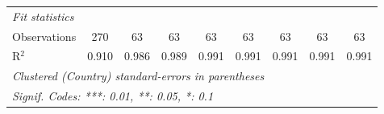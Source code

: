 \begin{table}[htbp]
\begin{tabular}{lcccccccc}
      \midrule \emph{Fit statistics}\\
      Observations                                                                     & 270     & 63      & 63             & 63             & 63             & 63             & 63             & 63\\  
      R$^2$                                                                            & 0.910   & 0.986   & 0.989          & 0.991          & 0.991          & 0.991          & 0.991          & 0.991\\  
      \midrule
      \multicolumn{9}{l}{\emph{Clustered (Country) standard-errors in parentheses}}\\
      \multicolumn{9}{l}{\emph{Signif. Codes: ***: 0.01, **: 0.05, *: 0.1}}\\
   \end{tabular}
\end{table}


